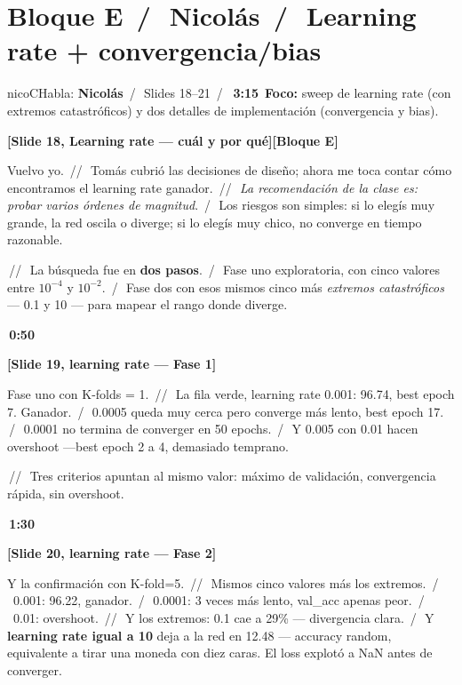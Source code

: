 \documentclass[11pt,a4paper]{article}
\newcommand{\slidenum}[1]{\textcolor{accent}{\textbf{[Slide #1]}}}
\newcommand{\timing}[1]{\textcolor{muted}{\textbf{\,#1\,}}}
\newcommand{\bloque}[1]{\textcolor{muted}{\small\textbf{[Bloque #1]}}}
\newcommand{\enunciado}[1]{\textcolor{warn}{\textit{#1}}}
\newcommand{\pausa}{\textcolor{muted}{\,/\,}}
\newcommand{\Pausa}{\textcolor{muted}{\,/\!/\,}}
\begin{document}
\section{Bloque E \pausa\ \textcolor{nicoC}{Nicolás} \pausa\ Learning rate + convergencia/bias}\label{sec:bloqueE}

\begin{personabox}{nicoC}{Habla: \textcolor{nicoC}{\textbf{Nicolás}} \pausa\ Slides 18--21 \pausa\ \timing{3:15}}
\textbf{Foco:} sweep de learning rate (con extremos catastróficos) y dos detalles de implementación (convergencia y bias).
\end{personabox}

\slidenum{18, Learning rate — cuál y por qué}\quad \bloque{E}

Vuelvo yo. \Pausa\ Tomás cubrió las decisiones de diseño; ahora me toca contar cómo encontramos el learning rate ganador. \Pausa\ \enunciado{La recomendación de la clase es: probar varios órdenes de magnitud}. \pausa\ Los riesgos son simples: si lo elegís muy grande, la red oscila o diverge; si lo elegís muy chico, no converge en tiempo razonable.

\Pausa\ La búsqueda fue en \textbf{dos pasos}. \pausa\ Fase uno exploratoria, con cinco valores entre $10^{-4}$ y $10^{-2}$. \pausa\ Fase dos con esos mismos cinco más \emph{extremos catastróficos} --- 0.1 y 10 --- para mapear el rango donde diverge.

\timing{0:50}

\slidenum{19, learning rate — Fase 1}

Fase uno con K-folds = 1. \Pausa\ La fila verde, learning rate 0.001: 96.74, best epoch 7. Ganador. \pausa\ 0.0005 queda muy cerca pero converge más lento, best epoch 17. \pausa\ 0.0001 no termina de converger en 50 epochs. \pausa\ Y 0.005 con 0.01 hacen overshoot ---best epoch 2 a 4, demasiado temprano.

\Pausa\ Tres criterios apuntan al mismo valor: máximo de validación, convergencia rápida, sin overshoot.

\timing{1:30}

\slidenum{20, learning rate — Fase 2}

Y la confirmación con K-fold=5. \Pausa\ Mismos cinco valores más los extremos. \pausa\ 0.001: 96.22, ganador. \pausa\ 0.0001: 3 veces más lento, val\_acc apenas peor. \pausa\ 0.01: overshoot. \Pausa\ Y los extremos: 0.1 cae a 29\% --- divergencia clara. \pausa\ Y \textbf{learning rate igual a 10} deja a la red en 12.48 --- accuracy random, equivalente a tirar una moneda con diez caras. El loss explotó a NaN antes de converger.
\end{document}
